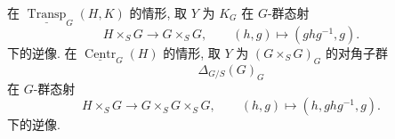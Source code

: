 在 \(\underline{\operatorname{Transp}}_G(H,K)\)
的情形, 取 \(Y\) 为 \(K_G\) 在 \(G\)-群态射
\[
  H\times_S G\longrightarrow G\times_S G,
  \qquad
  (h,g)\longmapsto(ghg^{-1},g).
\]
下的逆像. 在
\(\underline{\operatorname{Centr}}_G(H)\) 的情形,
取 \(Y\) 为 \((G\times_S G)_G\) 的对角子群
\[
  \Delta_{G/S}(G)_G
\]
在 \(G\)-群态射
\[
  H\times_S G\longrightarrow G\times_S G\times_S G,
  \qquad
  (h,g)\longmapsto(h,ghg^{-1},g).
\]
下的逆像.


